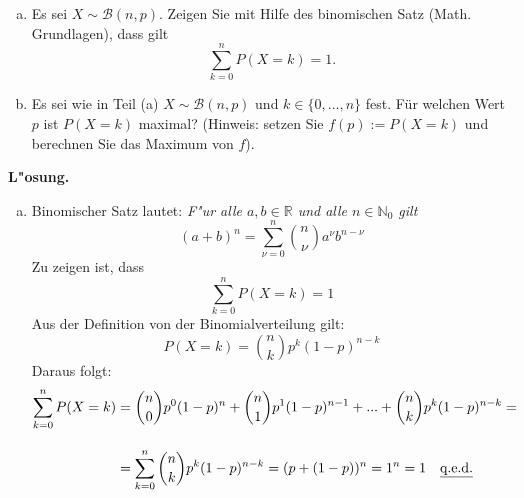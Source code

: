 \documentclass[10pt, oneside]{article}
\begin{document}
\begin{enumerate}[(a)]
    \item Es sei $X\sim\mathcal{B}(n,p)$. Zeigen Sie mit Hilfe des binomischen
        Satz (Math. Grundlagen), dass gilt $$\sum_{k=0}^nP(X=k)=1.$$
    \item Es sei wie in Teil (a) $X\sim\mathcal{B}(n,p)$ und $k\in\{0,...,n\}$
        fest. Für welchen Wert $p$ ist $P(X=k)$ maximal? (Hinweis: setzen
        Sie $f(p):=P(X=k)$ und berechnen
        Sie das Maximum von $f$).
\end{enumerate}
\textbf{L"osung.}
\begin{enumerate}[(a)]
    \item Binomischer Satz lautet: \textit{F"ur alle $a, b \in \mathbb{R}$ und alle $n \in \mathbb{N}_0$ gilt}
        \begin{equation}
            (a + b)^n = \sum_{\nu = 0}^n\binom{n}{\nu}a^{\nu}b^{n - \nu}
        \end{equation}
        Zu zeigen ist, dass
        \begin{equation*}
            \sum_{k=0}^nP(X=k)=1
        \end{equation*}
        Aus der Definition von der Binomialverteilung gilt:
        \begin{equation*}
            P(X = k) = \binom{n}{k}p^k(1 - p)^{n - k}
        \end{equation*}
        Daraus folgt:
        \begin{align*}
            \sum_{k=0}^nP(X=k) &= \binom{n}{0}p^0(1 - p)^{n} + \binom{n}{1}p^1(1 - p)^{n - 1} + ... + \binom{n}{k}p^k(1 - p)^{n - k} = \\[10pt]
                               &= \sum_{k = 0}^n\binom{n}{k}p^k(1 - p)^{n - k} = (p + (1 - p))^n = 1^n = 1 \quad \text{\underline{q.e.d.}}
        \end{align*}
\end{enumerate}
\end{document}

